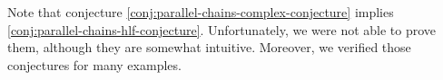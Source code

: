 Note that conjecture \ref{conj:parallel-chains-complex-conjecture} implies \ref{conj:parallel-chains-hlf-conjecture}. Unfortunately, we were not able to prove them, although they are somewhat intuitive. Moreover, we verified those conjectures for many examples.




  

